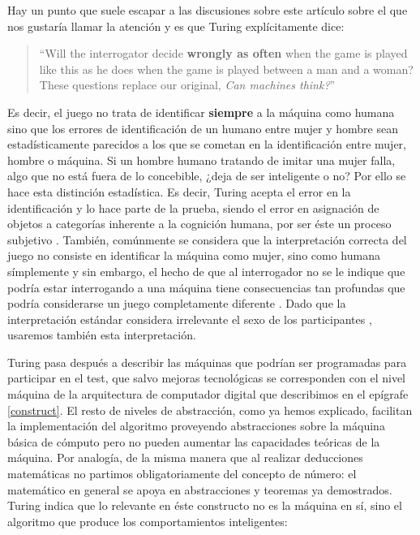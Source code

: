 \documentclass[12pt]{memoir}
\begin{document}
Hay un punto que suele escapar a las discusiones sobre este artículo sobre el que nos gustaría llamar la atención y es que Turing explícitamente dice:
 
\begin{quotation}
``Will the interrogator decide \textbf{wrongly as often} when the game is played like this as he does when the game is played between a man and a woman? These questions replace our original, \textit{Can machines think?}''  \parencite[apartado 1]{Turing1950cmi}
\end{quotation} 

Es decir, el juego no trata de identificar \textbf{siempre} a la máquina como humana sino que los errores de identificación de un humano entre mujer y hombre sean estadísticamente parecidos a los que se cometan en la identificación entre mujer, hombre o máquina. Si un hombre humano tratando de imitar una mujer falla, algo que no está fuera de lo concebible, ¿deja de ser inteligente o no? Por ello se hace esta distinción estadística. Es decir, Turing acepta el error en la identificación y lo hace parte de la prueba, siendo el error en asignación de objetos a categorías inherente a la cognición humana, por ser éste un proceso subjetivo \parencite{lakoff}. También, comúnmente se considera que la interpretación correcta del juego no consiste en identificar la máquina como mujer, sino como humana símplemente y sin embargo, el hecho de que al interrogador no se le indique que podría estar interrogando a una máquina tiene consecuencias tan profundas que podría considerarse un juego completamente diferente \parencite[apartado 2]{turingHarmful}. Dado que la interpretación estándar considera irrelevante el sexo de los participantes \parencite[apartado 3.1]{sep-turing-test}, usaremos también esta interpretación.

Turing pasa después a describir las máquinas que podrían ser programadas para participar en el test, que salvo mejoras tecnológicas se corresponden con el nivel máquina de la arquitectura de computador digital que describimos en el epígrafe \ref{construct}. El resto de niveles de abstracción, como ya hemos explicado, facilitan la implementación del algoritmo proveyendo abstracciones sobre la máquina básica de cómputo pero no pueden aumentar las capacidades teóricas de la máquina. Por analogía, de la misma manera que al realizar deducciones matemáticas no partimos obligatoriamente del concepto de número: el matemático en general se apoya en abstracciones y teoremas ya demostrados. Turing indica que lo relevante en éste constructo no es la máquina en sí, sino el algoritmo que produce los comportamientos inteligentes: 
\end{document}
